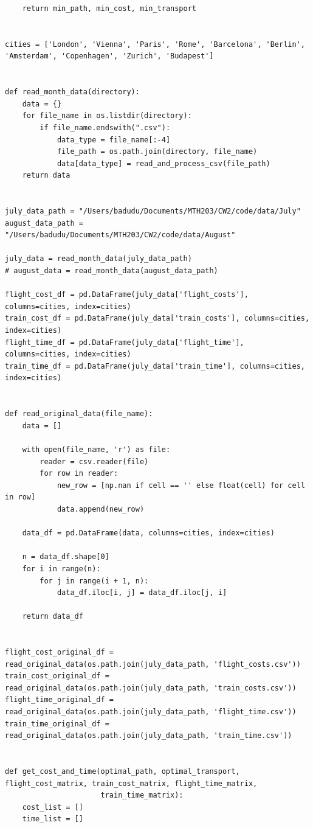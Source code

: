 \documentclass{article}
\begin{document}
\begin{lstlisting}
    return min_path, min_cost, min_transport


cities = ['London', 'Vienna', 'Paris', 'Rome', 'Barcelona', 'Berlin', 'Amsterdam', 'Copenhagen', 'Zurich', 'Budapest']


def read_month_data(directory):
    data = {}
    for file_name in os.listdir(directory):
        if file_name.endswith(".csv"):
            data_type = file_name[:-4]
            file_path = os.path.join(directory, file_name)
            data[data_type] = read_and_process_csv(file_path)
    return data


july_data_path = "/Users/badudu/Documents/MTH203/CW2/code/data/July"
august_data_path = "/Users/badudu/Documents/MTH203/CW2/code/data/August"

july_data = read_month_data(july_data_path)
# august_data = read_month_data(august_data_path)

flight_cost_df = pd.DataFrame(july_data['flight_costs'], columns=cities, index=cities)
train_cost_df = pd.DataFrame(july_data['train_costs'], columns=cities, index=cities)
flight_time_df = pd.DataFrame(july_data['flight_time'], columns=cities, index=cities)
train_time_df = pd.DataFrame(july_data['train_time'], columns=cities, index=cities)


def read_original_data(file_name):
    data = []

    with open(file_name, 'r') as file:
        reader = csv.reader(file)
        for row in reader:
            new_row = [np.nan if cell == '' else float(cell) for cell in row]
            data.append(new_row)

    data_df = pd.DataFrame(data, columns=cities, index=cities)

    n = data_df.shape[0]
    for i in range(n):
        for j in range(i + 1, n):
            data_df.iloc[i, j] = data_df.iloc[j, i]

    return data_df


flight_cost_original_df = read_original_data(os.path.join(july_data_path, 'flight_costs.csv'))
train_cost_original_df = read_original_data(os.path.join(july_data_path, 'train_costs.csv'))
flight_time_original_df = read_original_data(os.path.join(july_data_path, 'flight_time.csv'))
train_time_original_df = read_original_data(os.path.join(july_data_path, 'train_time.csv'))


def get_cost_and_time(optimal_path, optimal_transport, flight_cost_matrix, train_cost_matrix, flight_time_matrix,
                      train_time_matrix):
    cost_list = []
    time_list = []


\end{lstlisting}
\end{document}
